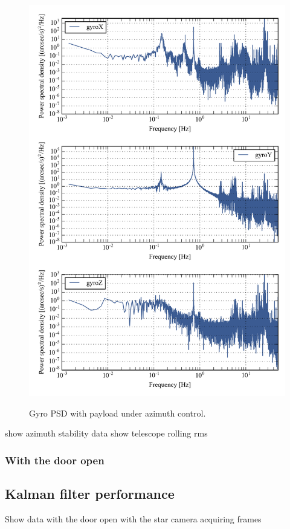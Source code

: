 \begin{figure}[!h]
\begin{center}
\includegraphics{Figures/multiPSD100.png}
\label{fig:multiPSD100_controlled}
\vspace{-0.5cm}
\caption[Gyro PSD with payload lifted, under azimuth control]{Gyro PSD with payload under azimuth control.}
\end{center}
\end{figure}


 show azimuth stability data
show telescope rolling rms
\subsubsection{With the door open}
\subsection{Kalman filter performance}
Show data with the door open with the star camera acquiring frames
